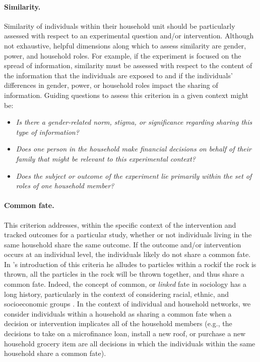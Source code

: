 \paragraph{Similarity.} Similarity of individuals within their household unit should be particularly assessed with respect to an experimental question and/or intervention. Although not exhaustive, helpful dimensions along which to assess similarity are gender, power, and household roles. For example, if the experiment is focused on the spread of information, similarity must be assessed with respect to the content of the information that the individuals are exposed to and if the individuals' differences in gender, power, or household roles impact the sharing of information. Guiding questions to assess this criterion in a given context might be: 
\begin{itemize}
    \item \textit{Is there a gender-related norm, stigma, or significance regarding sharing this type of information?}
    \item \textit{Does one person in the household make financial decisions on behalf of their family that might be relevant to this experimental context?}
    \item \textit{Does the subject or outcome of the experiment lie primarily within the set of roles of one household member?}
\end{itemize}

\paragraph{Common fate.} This criterion addresses, within the specific context of the intervention and tracked outcomes for a particular study, whether or not individuals living in the same household share the same outcome. If the outcome and/or intervention occurs at an individual level, the individuals likely do not share a common fate. In \citeauthor{campbell1958common}'s introduction of this criteria he alludes to particles within a rock\textemdash if the rock is thrown, all the particles in the rock will be thrown together, and thus share a common fate. Indeed, the concept of common, or \textit{linked} fate in sociology has a long history, particularly in the context of considering racial, ethnic, and socioeconomic groups \citep{brewer2000superordinate, simien2005race}. In the context of individual and household networks, we consider individuals within a household as sharing a common fate when a decision or intervention implicates all of the household members (e.g., the decisions to take on a microfinance loan, install a new roof, or purchase a new household grocery item are all decisions in which the individuals within the same household share a common fate).

